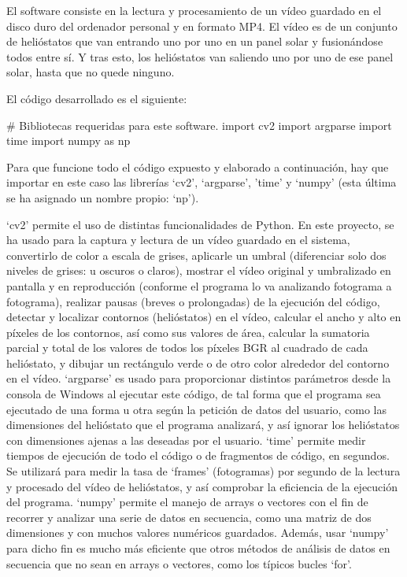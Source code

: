 \documentclass[12pt]{article}
\begin{document}
El software consiste en la lectura y procesamiento de un vídeo guardado en el disco duro del ordenador personal y en formato MP4. El vídeo es de un conjunto de helióstatos que van entrando uno por uno en un panel solar y fusionándose todos entre sí. Y tras esto, los helióstatos van saliendo uno por uno de ese panel solar, hasta que no quede ninguno.

El código desarrollado es el siguiente:

\# Bibliotecas requeridas para este software.
import cv2
import argparse
import time
import numpy as np

Para que funcione todo el código expuesto y elaborado a continuación, hay que importar en este caso las librerías ‘cv2’, ‘argparse’, 'time' y ‘numpy’ (esta última se ha asignado un nombre propio: ‘np’).

‘cv2’ permite el uso de distintas funcionalidades de Python. En este proyecto, se ha usado para la captura y lectura de un vídeo guardado en el sistema, convertirlo de color a escala de grises, aplicarle un umbral (diferenciar solo dos niveles de grises: u oscuros o claros), mostrar el vídeo original y umbralizado en pantalla y en reproducción (conforme el programa lo va analizando fotograma a fotograma), realizar pausas (breves o prolongadas) de la ejecución del código, detectar y localizar contornos (helióstatos) en el vídeo, calcular el ancho y alto en píxeles de los contornos, así como sus valores de área, calcular la sumatoria parcial y total de los valores de todos los píxeles BGR al cuadrado de cada helióstato, y dibujar un rectángulo verde o de otro color alrededor del contorno en el vídeo.
‘argparse’ es usado para proporcionar distintos parámetros desde la consola de Windows al ejecutar este código, de tal forma que el programa sea ejecutado de una forma u otra según la petición de datos del usuario, como las dimensiones del helióstato que el programa analizará, y así ignorar los helióstatos con dimensiones ajenas a las deseadas por el usuario.
‘time’ permite medir tiempos de ejecución de todo el código o de fragmentos de código, en segundos. Se utilizará para medir la tasa de ‘frames’ (fotogramas) por segundo de la lectura y procesado del vídeo de helióstatos, y así comprobar la eficiencia de la ejecución del programa.
‘numpy’ permite el manejo de arrays o vectores con el fin de recorrer y analizar una serie de datos en secuencia, como una matriz de dos dimensiones y con muchos valores numéricos guardados. Además, usar ‘numpy’ para dicho fin es mucho más eficiente que otros métodos de análisis de datos en secuencia que no sean en arrays o vectores, como los típicos bucles ‘for’.
\end{document}
